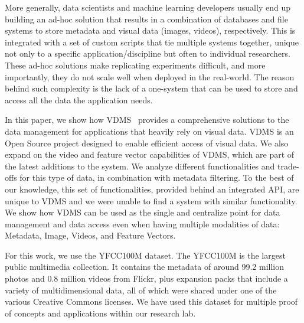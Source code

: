 More generally, data scientists and machine learning developers 
usually end up building an ad-hoc solution that results in a 
combination of databases and file systems to store 
metadata and visual data (images, videos), respectively. 
This is integrated with a set of custom scripts that tie multiple systems together, 
unique not only to a specific application/discipline but often to individual researchers.
These ad-hoc solutions make replicating experiments difficult, 
and more importantly, they do not scale well when deployed in the real-world.
The reason behind such complexity is the lack of a one-system 
that can be used to store and access all the data the application needs.

In this paper, we show how VDMS~\cite{vdms-nips} provides a comprehensive solutions 
to the data management for applications that heavily rely on visual data. 
VDMS is an Open Source project designed to enable efficient access of visual data.
We also expand on the video and feature vector capabilities of
VDMS, which are part of the latest additions to the system.
We analyze different functionalities and trade-offs for this type of data,
in combination with metadata filtering. 
To the best of our knowledge, this set of functionalities, 
provided behind an integrated API, are unique to VDMS and 
we were unable to find a system with similar functionality.
We show how VDMS can be used as the single and centralize point for data
management and data access even when having multiple modalities of data:
Metadata, Image, Videos, and Feature Vectors.

For this work, we use the YFCC100M dataset\cite{Thomee_2016}. 
The YFCC100M is the largest public multimedia collection. 
It contains the metadata of around 99.2 million photos 
and 0.8 million videos from Flickr,
plus expansion packs that include a variety of multidimensional data,
all of which were shared under one of the various Creative Commons licenses.
We have used this dataset
for multiple proof of concepts and applications within our research lab. 
